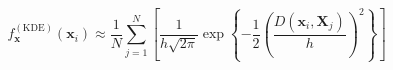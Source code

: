 \begin{equation}
    \label{eq:ad_knn}
    f_{\bm{x}}^{(\text{KDE})}(\bm{x}_i) \approx \frac{1}{N}\sum_{j = 1}^{N}\left[\frac{1}{h\sqrt{2\pi}}\exp\left\lbrace-\frac{1}{2}\left(\frac{D(\bm{x}_i,\bm{X}_j)}{h}\right)^2\right\rbrace\right]
\end{equation}
